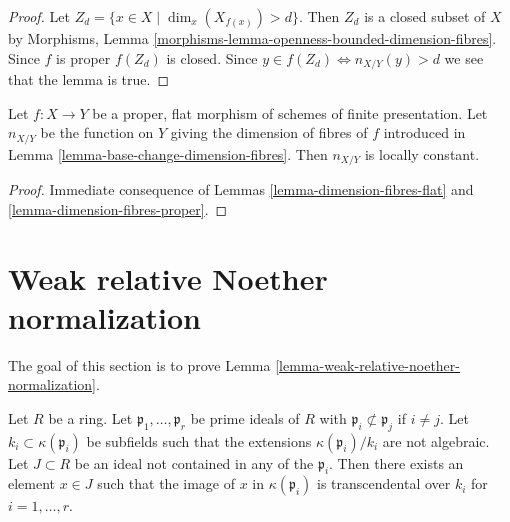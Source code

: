 \begin{proof}
Let $Z_d = \{x \in X \mid \dim_x(X_{f(x)}) > d\}$.
Then $Z_d$ is a closed subset of $X$ by
Morphisms, Lemma \ref{morphisms-lemma-openness-bounded-dimension-fibres}.
Since $f$ is proper $f(Z_d)$ is closed.
Since $y \in f(Z_d) \Leftrightarrow n_{X/Y}(y) > d$
we see that the lemma is true.
\end{proof}

\begin{lemma}
\label{lemma-dimension-fibres-proper-flat}
Let $f : X \to Y$ be a proper, flat morphism of schemes of finite presentation.
Let $n_{X/Y}$ be the function on $Y$ giving the dimension of fibres of $f$
introduced in Lemma \ref{lemma-base-change-dimension-fibres}.
Then $n_{X/Y}$ is locally constant.
\end{lemma}

\begin{proof}
Immediate consequence of
Lemmas \ref{lemma-dimension-fibres-flat} and
\ref{lemma-dimension-fibres-proper}.
\end{proof}

















\section{Weak relative Noether normalization}
\label{section-relative-noether-normalization}

\noindent
The goal of this section is to prove
Lemma \ref{lemma-weak-relative-noether-normalization}.

\begin{lemma}
\label{lemma-silly}
Let $R$ be a ring. Let $\mathfrak p_1, \ldots, \mathfrak p_r$
be prime ideals of $R$ with $\mathfrak p_i \not \subset \mathfrak p_j$
if $i \not = j$. Let $k_i \subset \kappa(\mathfrak p_i)$ be
subfields such that the extensions $\kappa(\mathfrak p_i)/k_i$
are not algebraic. Let $J \subset R$ be an ideal not contained
in any of the $\mathfrak p_i$. Then there exists an element $x \in J$
such that the image of $x$ in $\kappa(\mathfrak p_i)$
is transcendental over $k_i$ for $i = 1, \ldots, r$.
\end{lemma}

